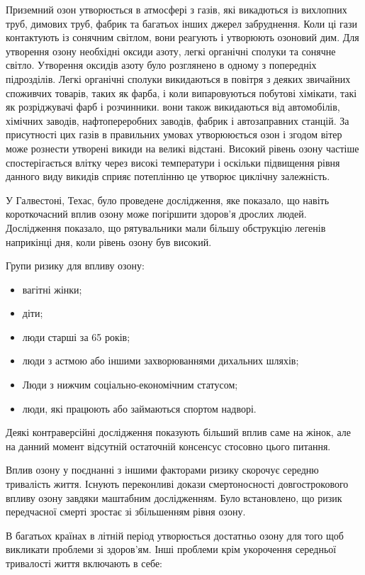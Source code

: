 Приземний озон утворюється в атмосфері з газів, які викадються із вихлопних труб, димових труб, 
фабрик та багатьох інших джерел забруднення. Коли ці гази контактують із сонячним світлом, 
вони реагують і утворюють озоновий дим. Для утворення озону необхідні оксиди азоту, легкі органічні сполуки та сонячне світло. Утворення оксидів азоту було розглянено в одному з 
попередніх підрозділів. Легкі органічні сполуки викидаються в повітря з деяких звичайних 
споживчих товарів, таких як фарба, і коли випаровуються побутові хімікати, такі як розріджувачі 
фарб і розчинники. вони також викидаються від автомобілів, хімічних заводів, нафтопереробних 
заводів, фабрик і автозаправних станцій. За присутності цих газів в правильних умовах 
утворююється озон і згодом вітер може рознести утворені викиди на великі відстані. 
Високий рівень озону частіше спостерігається влітку через високі температури і оскільки 
підвищення рівня данного виду викидів сприяє потеплінню це утворює циклічну залежність.

У Галвестоні, Техас, було проведене дослідження, яке показало, що навіть короткочасний вплив 
озону може погіршити здоров'я дрослих людей. Дослідження показало, що рятувальники мали більшу 
обструкцію легенів наприкінці дня, коли рівень озону був високий.

Групи ризику для впливу озону:

\begin{itemize}
    \item вагітні жінки;
    \item діти;
    \item люди старші за 65 років;
    \item люди з астмою або іншими захворюваннями дихальних шляхів;
    \item Люди з нижчим соціально-економічним статусом;
    \item люди, які працюють або займаються спортом надворі.
\end{itemize}

Деякі контраверсійні дослідження показують більший вплив саме на жінок, але на данний момент 
відсутній остаточній консенсус стосовно цього питання.

Вплив озону у поєднанні з іншими факторами ризику скорочує середню тривалість життя. Існують 
переконливі докази смертоносності довгострокового впливу озону завдяки маштабним дослідженням. 
Було встановлено, що ризик передчасної смерті зростає зі збільшенням рівня озону. 

В багатьох країнах в літній період утворюється достатньо озону для того щоб викликати проблеми 
зі здоров'ям. Інші проблеми крім укорочення середньої тривалості життя включають в себе: 

